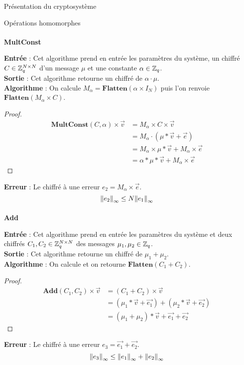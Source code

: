 \begin{section}{Présentation du cryptosystème}
\begin{subsection}{Opérations homomorphes}
	\paragraph{}
	\textbf{MultConst}
	\flushleft
	
	\textbf{Entrée} : Cet algorithme prend en entrée les paramètres du système, un chiffré $C \in \mathbb{Z}_q^{N \times N}$ d'un message $\mu$ et une constante $\alpha \in \mathbb{Z}_q$. \\
	\textbf{Sortie} : Cet algorithme retourne un chiffré de $\alpha \cdot \mu$.\\
	\textbf{Algorithme} : On calcule $M_{\alpha} = \textbf{Flatten}(\alpha \times I_N)$ puis l'on renvoie $\textbf{Flatten}(M_{\alpha} \times C)$.
	\begin{proof}
	\begin{align*}
	\textbf{MultConst}(C, \alpha) \times \vec{v} &= M_{\alpha} \times C \times \vec{v} \\
	&= M_{\alpha} \cdot (\mu * \vec{v} + \vec{e}) \\
	&= M_{\alpha} \times \mu * \vec{v} + M_{\alpha} \times \vec{e} \\
	&= \alpha * \mu * \vec{v} + M_{\alpha} \times \vec{e}
	\end{align*}
	\end{proof}
	\textbf{Erreur} : Le chiffré à une erreur $e_2 = M_\alpha \times
		\vec{e}$. 
		\[{\|e_2\|}_{\infty} \leq N {\|e_1\|}_{\infty}\]
	\paragraph{}
	\textbf{Add}
	\flushleft
	
	\textbf{Entrée} : Cet algorithme prend en entrée les paramètres du système et deux chiffrés $C_1, C_2 \in \mathbb{Z}_q^{N \times N}$ des messages $\mu_1, \mu_2 \in \mathbb{Z}_q$.\\
	\textbf{Sortie} : Cet algorithme retourne un chiffré de $\mu_1 + \mu_2$.\\
	\textbf{Algorithme} : On calcule et on retourne $\textbf{Flatten}(C_1 + C_2)$.
	\begin{proof}
	\begin{align*}
	\textbf{Add}(C_1, C_2) \times \vec{v} &= (C_1 + C_2) \times \vec{v} \\
	&= (\mu_1 * \vec{v} + \vec{e_1}) + (\mu_2 * \vec{v} + \vec{e_2}) \\
	&= (\mu_1 + \mu_2) * \vec{v} + \vec{e_1} + \vec{e_2}
	\end{align*}
	\end{proof}
\textbf{Erreur} : Le chiffré à une erreur $e_3 = \vec{e_1} + \vec{e_2}$.
\[{\|e_3\|}_{\infty} \leq {\|e_1\|}_{\infty} + {\|e_2\|}_{\infty}\] 

\end{subsection}
\end{section}
